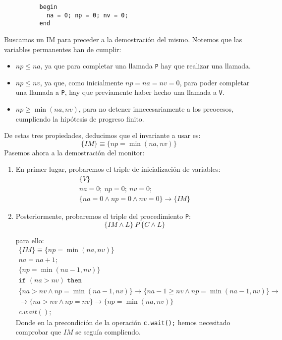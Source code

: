 \begin{ejercicio*}
\begin{verbatim}
          begin
            na = 0; np = 0; nv = 0;
          end
    \end{verbatim}
    Buscamos un IM para preceder a la demostración del mismo. Notemos que las variables permanentes han de cumplir:
    \begin{itemize}
        \item $np \leq na$, ya que para completar una llamada \verb|P| hay que realizar una llamada.
        \item $np \leq nv$, ya que, como inicialmente $np = na = nv = 0$, para poder completar una llamada a \verb|P|, hay que previamente haber hecho una llamada a \verb|V|.
        \item $np \geq \min(na,nv)$, para no detener innecesariamente a los preocesos, cumpliendo la hipótesis de progreso finito.
    \end{itemize}
    De estas tres propiedades, deducimos que el invariante a usar es:
    \begin{equation*}
        \{IM\} \equiv \{np = \min(na,nv)\}
    \end{equation*}
    Pasemos ahora a la demostración del monitor:
    \begin{enumerate}
        \item En primer lugar, probaremos el triple de inicialización de variables:
            \begin{gather*}
                \{V\} \\
                na = 0;\ np=0;\ nv=0; \\
                \{na = 0 \land np = 0 \land nv = 0\} \rightarrow \{IM\}
            \end{gather*}
        \item Posteriormente, probaremos el triple del procedimiento \verb|P|:
            \begin{equation*}
                \{IM \land L\}\ P\ \{C \land L\}
            \end{equation*}

            para ello:
            \begin{gather*}
                \{IM\}\equiv \{np=\min(na,nv)\} \\
                na = na + 1;\\
                \{np = \min(na-1,nv)\} \\
                \texttt{if\ }(na > nv) \texttt{\ then\ } \\
                \{na > nv \land np = \min(na-1,nv)\} \rightarrow \{na-1\geq nv \land np = \min(na-1,nv)\} \rightarrow \\ 
                \rightarrow\{na > nv \land np = nv\} \rightarrow \{np = \min(na,nv)\} \\
                c.wait();
            \end{gather*}
            Donde en la precondición de la operación \verb|c.wait();| hemos necesitado comprobar que $IM$ se seguía compliendo.


\end{enumerate}
\end{ejercicio*}
